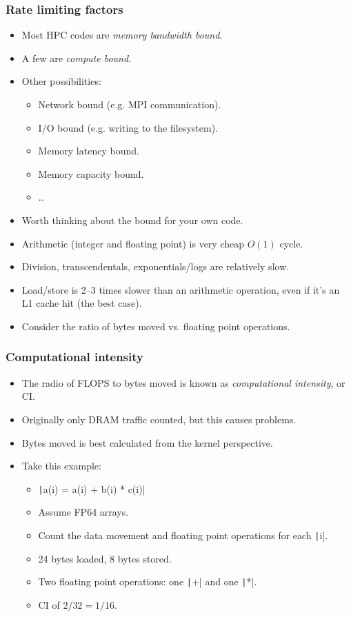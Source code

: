 \documentclass{beamer}
\begin{document}
\begin{frame}
\frametitle{Rate limiting factors}
\begin{itemize}
  \item Most HPC codes are \emph{memory bandwidth bound}.
  \item A few are \emph{compute bound}.
  \item Other possibilities:
    \begin{itemize}
      \item Network bound (e.g. MPI communication).
      \item I/O bound (e.g. writing to the filesystem).
      \item Memory latency bound.
      \item Memory capacity bound.
      \item \dots
    \end{itemize}
  \item Worth thinking about the bound for your own code.
  \item Arithmetic (integer and floating point) is very cheap $O(1)$ cycle.
  \item Division, transcendentals, exponentials/logs are relatively slow.
  \item Load/store is 2--3 times slower than an arithmetic operation, even if it's an L1 cache hit (the best case).
  \item Consider the ratio of bytes moved vs. floating point operations.
\end{itemize}
\end{frame}
\begin{frame}
\frametitle{Computational intensity}
\begin{itemize}
  \item The radio of FLOPS to bytes moved is known as \emph{computational intensity}, or CI.
  \item Originally only DRAM traffic counted, but this causes problems.
  \item Bytes moved is best calculated from the kernel perspective.
  \item Take this example:
    \begin{itemize}
      \item \texttt|a(i) = a(i) + b(i) * c(i)|
      \item Assume FP64 arrays.
      \item Count the data movement and floating point operations for each \texttt|i|.
      \item 24 bytes loaded, 8 bytes stored.
      \item Two floating point operations: one \texttt|+| and one \texttt|*|.
      \item CI of $2/32 = 1/16$.
    \end{itemize}
\end{itemize}
\end{frame}
\end{document}
